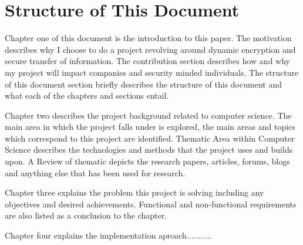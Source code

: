 \section{Structure of This Document}
Chapter one of this document is the introduction to this paper. The motivation describes why I choose to do a project revolving around dynamic encryption and secure transfer of information. The contribution section describes how and why my project will impact companies and security minded individuals. The structure of this document section briefly describes the structure of this document and what each of the chapters and sections entail.

Chapter two describes the project background related to computer science. The main area in which the project falls under is explored, the main areas and topics which correspond to this project are identified. Thematic Area within Computer Science describes the technologies and methods that the project uses and builds upon. A Review of thematic depicts the research papers, articles, forums, blogs and anything else that has been used for research.

Chapter three explains the problem this project is solving including any objectives and desired achievements. Functional and non-functional requirements are also listed as a conclusion to the chapter.

Chapter four explains the implementation aproach...........